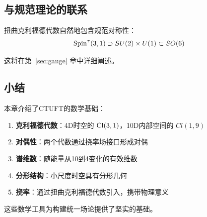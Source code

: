 \subsection{与规范理论的联系}

扭曲克利福德代数自然地包含规范对称性：
\begin{equation}
    \mathrm{Spin}^\tau(3,1) \supset SU(2) \times U(1) \subset SO(6)
\end{equation}

这将在第~\ref{sec:gauge} 章中详细阐述。

\subsection{小结}

本章介绍了CTUFT的数学基础：
\begin{enumerate}
    \item \textbf{克利福德代数}：4D时空的 $\mathrm{Cl}(3,1)$，10D内部空间的 $Cl(1,9)$
    \item \textbf{对偶性}：两个代数通过挠率场接口形成对偶
    \item \textbf{谱维数}：随能量从10到4变化的有效维数
    \item \textbf{分形结构}：小尺度时空具有分形几何
    \item \textbf{挠率}：通过扭曲克利福德代数引入，携带物理意义
\end{enumerate}

这些数学工具为构建统一场论提供了坚实的基础。
